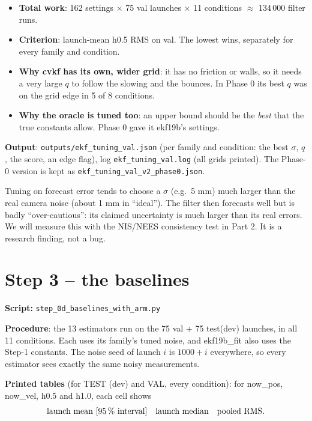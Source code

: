 \documentclass[11pt,a4paper]{article}
\begin{document}
\begin{itemize}
\item \textbf{Total work}: 162 settings $\times$ 75 val launches $\times$ 11 conditions $\approx$ 134\,000 filter runs.
\item \textbf{Criterion}: launch-mean h0.5 RMS on val. The lowest wins, separately for every family and condition.
\item \textbf{Why cvkf has its own, wider grid}: it has no friction or walls, so it needs a very large $q$ to follow the
  slowing and the bounces. In Phase 0 its best $q$ was on the grid edge in 5 of 8 conditions.
\item \textbf{Why the oracle is tuned too}: an upper bound should be the \emph{best} that the true constants allow.
  Phase 0 gave it ekf19b's settings.
\end{itemize}
\textbf{Output}: \texttt{outputs/ekf\_tuning\_val.json} (per family and condition: the best $\sigma$, $q$, the score, an
edge flag), log \texttt{ekf\_tuning\_val.log} (all grids printed). The Phase-0 version is kept as
\texttt{ekf\_tuning\_val\_v2\_phase0.json}.

\begin{warn}
Tuning on forecast error tends to choose a $\sigma$ (e.g.\ 5 mm) much larger than the real camera noise (about 1 mm in
``ideal''). The filter then forecasts well but is badly ``over-cautious'': its claimed uncertainty is much larger than its
real errors. We will measure this with the NIS/NEES consistency test in Part 2. It is a research finding, not a bug.
\end{warn}

\section{Step 3 -- the baselines}
\noindent\textbf{Script:} \texttt{step\_0d\_baselines\_with\_arm.py}\par\medskip
\textbf{Procedure}: the 13 estimators run on the 75 val + 75 test(dev) launches, in all 11 conditions. Each uses its
family's tuned noise, and ekf19b\_fit also uses the Step-1 constants. The noise seed of launch $i$ is $1000+i$
everywhere, so every estimator sees exactly the same noisy measurements.

\textbf{Printed tables} (for TEST (dev) and VAL, every condition): for now\_pos, now\_vel, h0.5 and h1.0, each cell shows
\[ \text{launch mean}\ [\text{95\,\% interval}]\quad \text{launch median}\quad \text{pooled RMS}. \]
\end{document}
